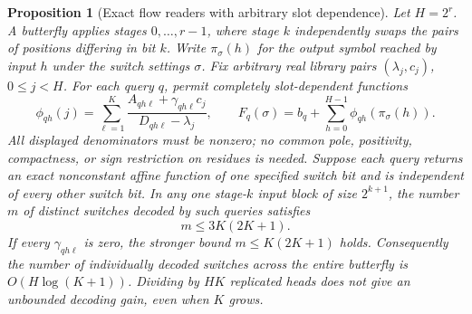 \documentclass[11pt]{article}
\newtheorem{proposition}{Proposition}
\begin{document}
\begin{proposition}[Exact flow readers with arbitrary slot dependence]
Let $H=2^r$. A butterfly applies stages $0,\ldots,r-1$, where stage $k$
independently swaps the pairs of positions differing in bit $k$.
Write $\pi_\sigma(h)$ for the output symbol reached by input $h$ under
the switch settings $\sigma$. Fix arbitrary real library pairs
$(\lambda_j,c_j)$, $0\leq j<H$. For each query $q$, permit completely
slot-dependent functions
\[
 \phi_{qh}(j)=\sum_{\ell=1}^K
       \frac{A_{qh\ell}+\gamma_{qh\ell}c_j}
            {D_{qh\ell}-\lambda_j},
 \qquad
 F_q(\sigma)=b_q+\sum_{h=0}^{H-1}\phi_{qh}(\pi_\sigma(h)).
\]
All displayed denominators must be nonzero; no common pole,
positivity, compactness, or sign restriction on residues is needed.
Suppose each query returns an exact nonconstant affine function
of one specified switch bit and is independent of every other switch
bit. In any one stage-$k$ input block of size $2^{k+1}$, the number
$m$ of distinct switches decoded by such queries satisfies
\[
 m\leq 3K(2K+1).
\]
If every $\gamma_{qh\ell}$ is zero, the stronger bound
$m\leq K(2K+1)$ holds.
Consequently the number of individually decoded switches across the
entire butterfly is $O(H\log(K+1))$. Dividing by $HK$ replicated heads
does not give an unbounded decoding gain, even when $K$ grows.
\end{proposition}
\end{document}
